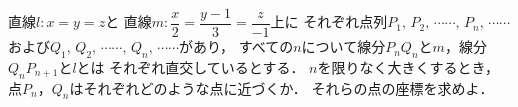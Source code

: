 \documentclass[../../main.tex]{subfiles}
\begin{document}
直線$l:x=y=z$と
直線$\displaystyle m:\dfrac{x}{2}=\dfrac{y-1}{3}=\dfrac{z}{-1}$上に
それぞれ点列$P_1, \, P_2, \, \cdots\cdots, \, P_n, \, \cdots\cdots$
および$Q_1, \, Q_2, \, \cdots\cdots, \, Q_n, \, \cdots\cdots$があり，
すべての$n$について線分$P_nQ_n$と$m$，線分$Q_nP_{n+1}$と$l$とは
それぞれ直交しているとする．
$n$を限りなく大きくするとき，
点$P_n$，$Q_n$はそれぞれどのような点に近づくか．
それらの点の座標を求めよ．
\end{document}
